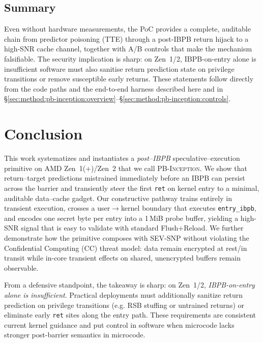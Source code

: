 \documentclass[11pt,a4paper]{article}
\begin{document}
\subsection{Summary}
Even without hardware measurements, the PoC provides a complete, auditable chain from predictor poisoning (TTE) through a post-IBPB return hijack to a high-SNR cache channel, together with A/B controls that make the mechanism falsifiable. The security implication is sharp: on Zen~1/2, IBPB-on-entry alone is insufficient software must also sanitise return prediction state on privilege transitions or remove susceptible early returns. These statements follow directly from the code paths and the end-to-end harness described here and in \S\ref{sec:method:pb-inception:overview}--\S\ref{sec:method:pb-inception:controls}.\cite{wikner2025breaking,trujillo2023inception,linux_srso_doc,linux_rsb_doc}


\section{Conclusion}
\label{sec:conclusion}

This work systematizes and instantiates a \emph{post–IBPB} speculative–execution primitive on AMD Zen~1(+)/Zen~2 that we call \textsc{PB-Inception}. We show that return–target predictions mistrained immediately before an IBPB can persist across the barrier and transiently steer the first \texttt{ret} on kernel entry to a minimal, auditable data–cache gadget. Our constructive pathway trains entirely in transient execution, crosses a user$\rightarrow$kernel boundary that executes \texttt{entry\_ibpb}, and encodes one secret byte per entry into a 1\,MiB probe buffer, yielding a high-SNR signal that is easy to validate with standard Flush+Reload. We further demonstrate how the primitive composes with SEV-SNP without violating the Confidential Computing (CC) threat model: data remain encrypted at rest/in transit while in-core transient effects on shared, unencrypted buffers remain observable.

From a defensive standpoint, the takeaway is sharp: on Zen~1/2, \emph{IBPB-on-entry alone is insufficient}. Practical deployments must additionally sanitize return prediction on privilege transitions (e.g. RSB stuffing or untrained returns) or eliminate early \texttt{ret} sites along the entry path. These requirements are consistent current kernel guidance and put control in software when microcode lacks stronger post-barrier semantics in microcode.
\end{document}
